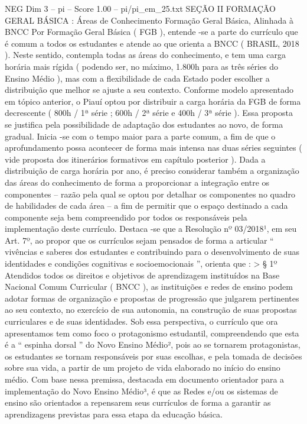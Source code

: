 \begin{textsample}{NEG Dim 3 – pi – Score 1.00 – pi/pi\_em\_25.txt}  \label{ex:f3_neg_031}
SEÇÃO II FORMAÇÃO GERAL BÁSICA : Áreas de Conhecimento Formação Geral Básica, Alinhada à BNCC Por Formação Geral Básica ( FGB ), entende -se a parte do currículo que é comum a todos os estudantes e atende ao que orienta a BNCC ( BRASIL, 2018 ).
Neste sentido, contempla todas as áreas do conhecimento, e tem uma carga horária mais rígida ( podendo ser, no máximo, 1.800h para as três séries do Ensino Médio ), mas com a flexibilidade de cada Estado poder escolher a distribuição que melhor se ajuste a seu contexto.
Conforme modelo apresentado em tópico anterior, o Piauí optou por distribuir a carga horária da FGB de forma decrescente ( 800h / 1ª série ; 600h / 2ª série e 400h / 3ª série ).
Essa proposta se justifica pela possibilidade de adaptação dos estudantes ao novo, de forma gradual.
Inicia -se com o tempo maior para a parte comum, a fim de que o aprofundamento possa acontecer de forma mais intensa nas duas séries seguintes ( vide proposta dos itinerários formativos em capítulo posterior ).
Dada a distribuição de carga horária por ano, é preciso considerar também a organização das áreas do conhecimento de forma a proporcionar a integração entre os componentes – razão pela qual se optou por detalhar os componentes no quadro de habilidades de cada área – a fim de permitir que o espaço destinado a cada componente seja bem compreendido por todos os responsáveis pela implementação deste currículo.
Destaca -se que a Resolução nº 03/2018¹, em seu Art. 7º, ao propor que os currículos sejam pensados de forma a articular “ vivências e saberes dos estudantes e contribuindo para o desenvolvimento de suas identidades e condições cognitivas e socioemocionais ”, orienta que : > § 1º Atendidos todos os direitos e objetivos de aprendizagem instituídos na Base Nacional Comum Curricular ( BNCC ), as instituições e redes de ensino podem adotar formas de organização e propostas de progressão que julgarem pertinentes ao seu contexto, no exercício de sua autonomia, na construção de suas propostas curriculares e de suas identidades.
Sob essa perspectiva, o currículo que ora apresentamos tem como foco o protagonismo estudantil, compreendendo que esta é a “ espinha dorsal ” do Novo Ensino Médio², pois ao se tornarem protagonistas, os estudantes se tornam responsáveis por suas escolhas, e pela tomada de decisões sobre sua vida, a partir de um projeto de vida elaborado no início do ensino médio.
Com base nessa premissa, destacada em documento orientador para a implementação do Novo Ensino Médio³, é que as Redes e/ou os sistemas de ensino são orientados a repensarem seus currículos de forma a garantir as aprendizagens previstas para essa etapa da educação básica.

\end{textsample}
